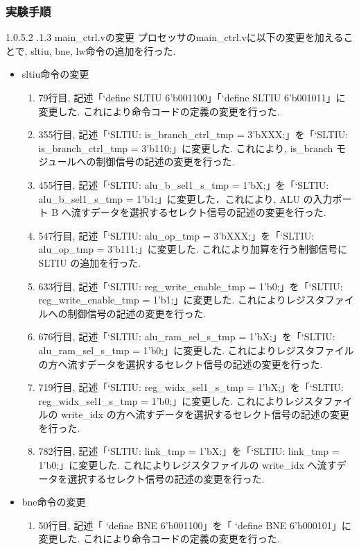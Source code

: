 \documentclass[epsf,a4paper,dvipdfmx,autodetect-engine,titlepage]{jsarticle}
\makeatletter
\newcommand{\subsubsubsection}
{\@startsection{paragraph}{4}{\z@}%
{1.0\Cvs \@plus.5\Cdp \@minus.2\Cdp}%
{.1\Cvs \@plus.3\Cdp}%
{\reset@font\sffamily\normalsize}}
\makeatother
\begin{document}
\subsubsection{実験手順}
\subsubsubsection{main\_ctrl.vの変更}
プロセッサのmain\_ctrl.vに以下の変更を加えることで, sltiu, bne, lw命令の追加を行った.
\begin{itemize}
    \item sltiu命令の変更
\begin{enumerate}
    \item 79行目, 記述「`define   SLTIU 6'b001100」「`define   SLTIU 6'b001011」に変更した. これにより命令コードの定義の変更を行った.
    
    \item 355行目, 記述「`SLTIU:  is\_branch\_ctrl\_tmp = 3'bXXX;」を「`SLTIU:  is\_branch\_ctrl\_tmp = 3'b110;」に変更した. これにより, is\_branch モジュールへの制御信号の記述の変更を行った.
    
    \item 455行目, 記述「`SLTIU:  alu\_b\_sel1\_s\_tmp = 1'bX;」を「`SLTIU:  alu\_b\_sel1\_s\_tmp = 1'b1;」に変更した．これにより, ALU の入力ポート B へ流すデータを選択するセレクト信号の記述の変更を行った.
    
    \item 547行目, 記述「`SLTIU:  alu\_op\_tmp = 3'bXXX;」を「`SLTIU:  alu\_op\_tmp = 3'b111;」に変更した. これにより加算を行う制御信号にSLTIU の追加を行った.
    
    \item 633行目, 記述「`SLTIU:  reg\_write\_enable\_tmp = 1'b0;」を「`SLTIU:  reg\_write\_enable\_tmp = 1'b1;」に変更した. これによりレジスタファイルへの制御信号の記述の変更を行った.
    
    \item 676行目, 記述「`SLTIU:  alu\_ram\_sel\_s\_tmp = 1'bX;」を「`SLTIU:  alu\_ram\_sel\_s\_tmp = 1'b0;」に変更した. これによりレジスタファイルの方へ流すデータを選択するセレクト信号の記述の変更を行った.
    
    \item 719行目, 記述「`SLTIU:  reg\_widx\_sel1\_s\_tmp = 1'bX;」を「`SLTIU:  reg\_widx\_sel1\_s\_tmp = 1'b0;」に変更した. これによりレジスタファイルの write\_idx の方へ流すデータを選択するセレクト信号の記述の変更を行った.
    
    \item 782行目, 記述「`SLTIU:  link\_tmp = 1'bX;」を「`SLTIU:  link\_tmp = 1'b0;」に変更した. これによりレジスタファイルの write\_idx へ流すデータを選択するセレクト信号の記述の変更を行った.
\end{enumerate}
    \item bne命令の変更
\begin{enumerate}
    \item 50行目, 記述「 `define    BNE  6'b001100」を「 `define    BNE  6'b000101」に変更した. これにより命令コードの定義の変更を行った.
    

\end{enumerate}
\end{itemize}
\end{document}
